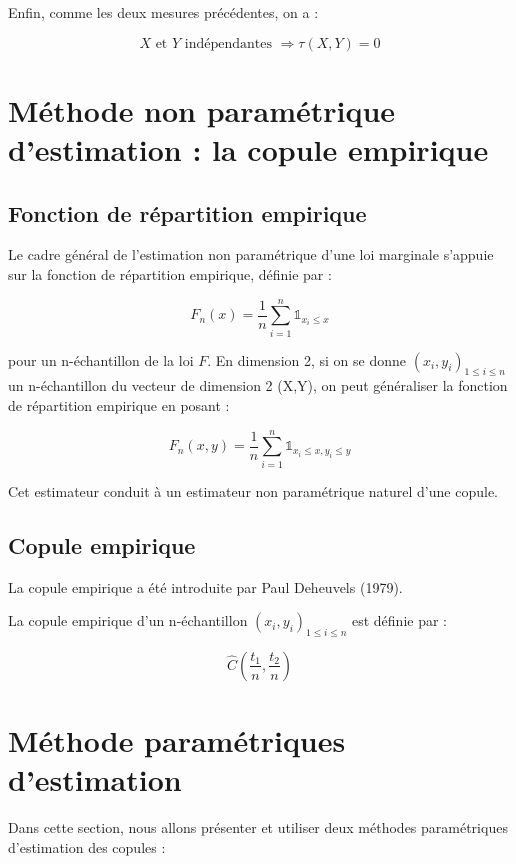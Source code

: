 Enfin, comme les deux mesures précédentes, on a :

$$
X \text{~et~} Y \text{~indépendantes~} \Longrightarrow \tau(X,Y) = 0
$$



\section{Méthode non paramétrique d'estimation : la copule empirique}
\subsection{Fonction de répartition empirique}

Le cadre général de l’estimation non paramétrique d’une loi marginale s’appuie sur la fonction de répartition empirique, définie par :

$$
F_n(x) = \frac{1}{n} \sum_{i=1}^n \mathbb{1}_{x_i \leq x}
$$

pour un n-échantillon de la loi $F$. En dimension 2, si on se donne $(x_i,y_i)_{1\leq i\leq n}$ un n-échantillon du vecteur de dimension 2 (X,Y), on peut 
généraliser la fonction de répartition empirique en posant :

$$F_n(x,y) = \frac{1}{n} \sum_{i=1}^n \mathbb{1}_{x_i \leq x, y_i \leq y}$$

Cet estimateur conduit à un estimateur non paramétrique naturel d’une copule.

\subsection{Copule empirique}

La copule empirique a été introduite par Paul Deheuvels (1979). 

La copule empirique d'un n-échantillon $(x_i,y_i)_{1\leq i\leq n}$ est définie par :

$$
\widehat{C}\left( \frac{t_1}{n},\frac{t_2}{n}\right)
$$





\section{Méthode paramétriques d'estimation}

Dans cette section, nous allons présenter et utiliser deux méthodes paramétriques d'estimation
des copules :

